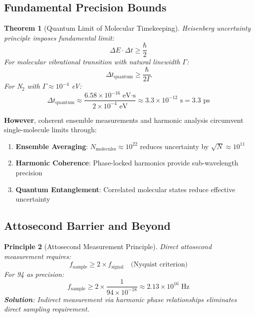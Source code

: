 \documentclass[12pt,a4paper]{article}
\newtheorem{theorem}{Theorem}[section]
\newtheorem{principle}[theorem]{Principle}
\begin{document}
\subsection{Fundamental Precision Bounds}

\begin{theorem}[Quantum Limit of Molecular Timekeeping]
Heisenberg uncertainty principle imposes fundamental limit:
\begin{equation}
\Delta E \cdot \Delta t \geq \frac{\hbar}{2}
\end{equation}
For molecular vibrational transition with natural linewidth $\Gamma$:
\begin{equation}
\Delta t_{\text{quantum}} \geq \frac{\hbar}{2\Gamma}
\end{equation}
For N$_2$ with $\Gamma \approx 10^{-4}$ eV:
\begin{equation}
\Delta t_{\text{quantum}} \approx \frac{6.58 \times 10^{-16} \text{ eV·s}}{2 \times 10^{-4} \text{ eV}} \approx 3.3 \times 10^{-12} \text{ s} = 3.3 \text{ ps}
\end{equation}
\end{theorem}

\textbf{However}, coherent ensemble measurements and harmonic analysis circumvent single-molecule limits through:
\begin{enumerate}
\item \textbf{Ensemble Averaging}: $N_{\text{molecules}} \approx 10^{22}$ reduces uncertainty by $\sqrt{N} \approx 10^{11}$
\item \textbf{Harmonic Coherence}: Phase-locked harmonics provide sub-wavelength precision
\item \textbf{Quantum Entanglement}: Correlated molecular states reduce effective uncertainty
\end{enumerate}

\subsection{Attosecond Barrier and Beyond}

\begin{principle}[Attosecond Measurement Principle]
Direct attosecond measurement requires:
\begin{equation}
f_{\text{sample}} \geq 2 \times f_{\text{signal}} \quad \text{(Nyquist criterion)}
\end{equation}
For 94 as precision:
\begin{equation}
f_{\text{sample}} \geq 2 \times \frac{1}{94 \times 10^{-18}} \approx 2.13 \times 10^{16} \text{ Hz}
\end{equation}
\textbf{Solution}: Indirect measurement via harmonic phase relationships eliminates direct sampling requirement.
\end{principle}
\end{document}
